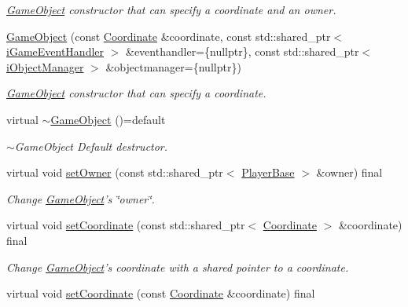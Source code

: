 \begin{DoxyCompactItemize}
\begin{DoxyCompactList}\small\item\em \hyperlink{classCourse_1_1GameObject}{Game\-Object} constructor that can specify a coordinate and an owner. \end{DoxyCompactList}\item 
\hyperlink{classCourse_1_1GameObject_a6dda384344838b53a330629c15b060c2}{Game\-Object} (const \hyperlink{classCourse_1_1Coordinate}{Coordinate} \&coordinate, const std\-::shared\-\_\-ptr$<$ \hyperlink{classCourse_1_1iGameEventHandler}{i\-Game\-Event\-Handler} $>$ \&eventhandler=\{nullptr\}, const std\-::shared\-\_\-ptr$<$ \hyperlink{classCourse_1_1iObjectManager}{i\-Object\-Manager} $>$ \&objectmanager=\{nullptr\})
\begin{DoxyCompactList}\small\item\em \hyperlink{classCourse_1_1GameObject}{Game\-Object} constructor that can specify a coordinate. \end{DoxyCompactList}\item 
virtual \hyperlink{classCourse_1_1GameObject_abfa4185247b43636bf53897a4731a763}{$\sim$\-Game\-Object} ()=default
\begin{DoxyCompactList}\small\item\em $\sim$\-Game\-Object Default destructor. \end{DoxyCompactList}\item 
virtual void \hyperlink{classCourse_1_1GameObject_a81a67b658271a5f3e08f5583e7075b27}{set\-Owner} (const std\-::shared\-\_\-ptr$<$ \hyperlink{classCourse_1_1PlayerBase}{Player\-Base} $>$ \&owner) final
\begin{DoxyCompactList}\small\item\em Change \hyperlink{classCourse_1_1GameObject}{Game\-Object}'s \char`\"{}owner\char`\"{}. \end{DoxyCompactList}\item 
virtual void \hyperlink{classCourse_1_1GameObject_acdb9942a83ae7247b6b5f241e4c6da3a}{set\-Coordinate} (const std\-::shared\-\_\-ptr$<$ \hyperlink{classCourse_1_1Coordinate}{Coordinate} $>$ \&coordinate) final
\begin{DoxyCompactList}\small\item\em Change \hyperlink{classCourse_1_1GameObject}{Game\-Object}'s coordinate with a shared pointer to a coordinate. \end{DoxyCompactList}\item 
virtual void \hyperlink{classCourse_1_1GameObject_a5161d3771985aa0bc64f238c29887c34}{set\-Coordinate} (const \hyperlink{classCourse_1_1Coordinate}{Coordinate} \&coordinate) final

\end{DoxyCompactItemize}
